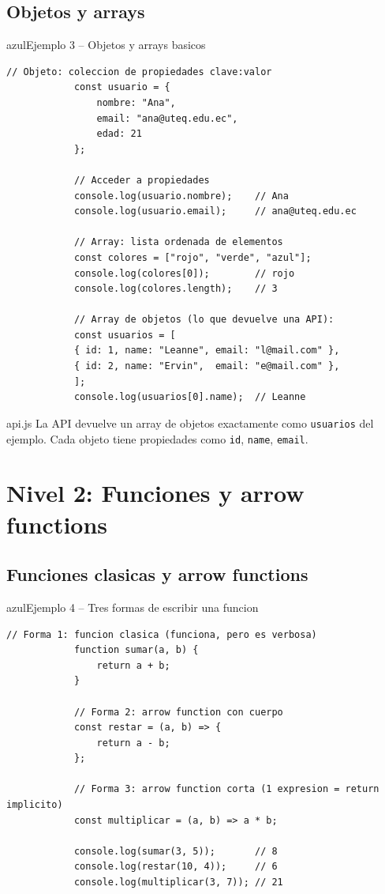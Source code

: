 \documentclass[11pt,a4paper]{article}
\begin{document}
	\subsection{Objetos y arrays}
	
	\begin{cajacodigo}{azul}{Ejemplo 3 -- Objetos y arrays basicos}
		\begin{lstlisting}[style=codejs]
			// Objeto: coleccion de propiedades clave:valor
			const usuario = {
				nombre: "Ana",
				email: "ana@uteq.edu.ec",
				edad: 21
			};
			
			// Acceder a propiedades
			console.log(usuario.nombre);    // Ana
			console.log(usuario.email);     // ana@uteq.edu.ec
			
			// Array: lista ordenada de elementos
			const colores = ["rojo", "verde", "azul"];
			console.log(colores[0]);        // rojo
			console.log(colores.length);    // 3
			
			// Array de objetos (lo que devuelve una API):
			const usuarios = [
			{ id: 1, name: "Leanne", email: "l@mail.com" },
			{ id: 2, name: "Ervin",  email: "e@mail.com" },
			];
			console.log(usuarios[0].name);  // Leanne
		\end{lstlisting}
	\end{cajacodigo}
	
	\begin{cajapractica}{api.js}
		La API devuelve un array de objetos exactamente como \texttt{usuarios} del ejemplo. Cada objeto tiene propiedades como \texttt{id}, \texttt{name}, \texttt{email}.
	\end{cajapractica}
	
	\section{Nivel 2: Funciones y arrow functions}
	
	\subsection{Funciones clasicas y arrow functions}
	
	\begin{cajacodigo}{azul}{Ejemplo 4 -- Tres formas de escribir una funcion}
		\begin{lstlisting}[style=codejs]
			// Forma 1: funcion clasica (funciona, pero es verbosa)
			function sumar(a, b) {
				return a + b;
			}
			
			// Forma 2: arrow function con cuerpo
			const restar = (a, b) => {
				return a - b;
			};
			
			// Forma 3: arrow function corta (1 expresion = return implicito)
			const multiplicar = (a, b) => a * b;
			
			console.log(sumar(3, 5));       // 8
			console.log(restar(10, 4));     // 6
			console.log(multiplicar(3, 7)); // 21
		\end{lstlisting}
	\end{cajacodigo}
	
\end{document}
